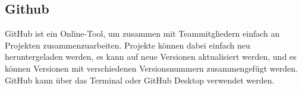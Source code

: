 \subsection{Github}
GitHub ist ein Online-Tool, um zusammen mit Teammitgliedern einfach an Projekten zusammenzuarbeiten. Projekte können dabei einfach neu heruntergeladen werden, es kann auf neue Versionen aktualisiert werden, und es können Versionen mit verschiedenen Versionsnummern zusammengefügt werden. GitHub kann über das Terminal oder GitHub Desktop verwendet werden.
